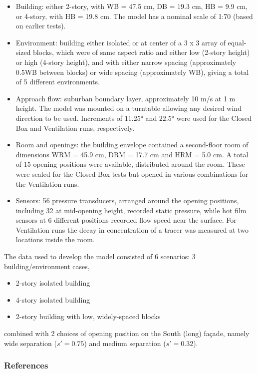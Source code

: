 \begin{itemize}
\item Building: either 2-story, with WB = 47.5 cm, DB = 19.3 cm, HB = 9.9 cm, or 4-story, with HB = 19.8 cm. The model has a nominal scale of 1:70 (based on earlier tests).
\item Environment: building either isolated or at center of a 3 x 3 array of equal-sized blocks, which were of same aspect ratio and either low (2-story height) or high (4-story height), and with either narrow spacing (approximately 0.5WB between blocks) or wide spacing (approximately WB), giving a total of 5 different environments.
\item Approach flow: suburban boundary layer, approximately 10 m/s at 1 m height. The model was mounted on a turntable allowing any desired wind direction to be used. Increments of $\ang{11.25}$ and $\ang{22.5}$ were used for the Closed Box and Ventilation runs, respectively.
\item Room and openings: the building envelope contained a second-floor room of dimensions WRM = 45.9 cm, DRM = 17.7 cm and HRM = 5.0 cm. A total of 15 opening positions were available, distributed around the room. These were sealed for the Closed Box tests but opened in various combinations for the Ventilation runs. 
\item Sensors: 56 pressure transducers, arranged around the opening positions, including 32 at mid-opening height, recorded static pressure, while hot film sensors at 6 different positions recorded flow speed near the surface. For Ventilation runs the decay in concentration of a tracer was measured at two locations inside the room.
\end{itemize}

The data used to develop the model consisted of 6 scenarios: 3 building/environment cases,
\begin{itemize}
\item 2-story isolated building
\item 4-story isolated building
\item 2-story building with low, widely-spaced blocks
\end{itemize}
combined with 2 choices of opening position on the South (long) fa\c{c}ade, namely wide separation ($s' = 0.75$) and medium separation ($s' = 0.32$). 

\subsubsection{References}
